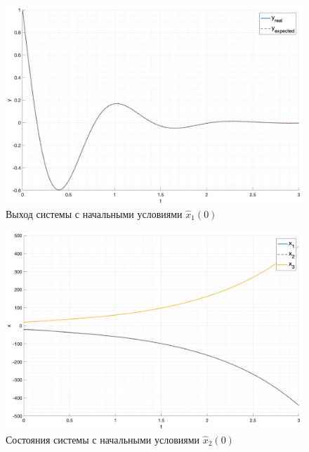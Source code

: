 \begin{figure}[ht!]
    \centering
    \includegraphics[width=\textwidth]{media/plots/task4_output_hat_1.png}
    \caption{Выход системы с начальными условиями $\hat{x}_1(0)$}
    \label{fig:task4_output__hat_1}
\end{figure}

\begin{figure}[ht!]
    \centering
    \includegraphics[width=\textwidth]{media/plots/task4_states_hat_2.png}
    \caption{Состояния системы с начальными условиями $\hat{x}_2(0)$}
    \label{fig:task4_states_hat_2}
\end{figure}

